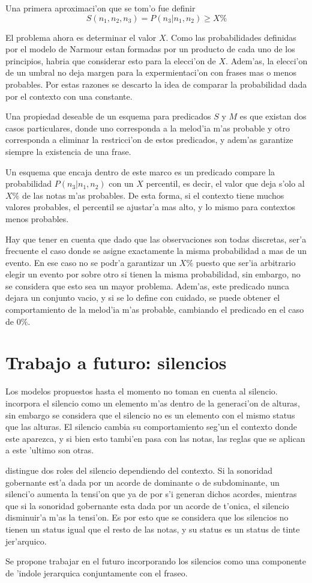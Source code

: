 Una primera aproximaci'on que se tom'o fue definir 
$$S(n_1, n_2, n_3) = P(n_3 | n_1, n_2) \geq X\%$$

El problema ahora es determinar
el valor $X$. Como las probabilidades definidas por el modelo de Narmour estan formadas por un producto de cada uno de los principios, habria 
que considerar esto para la elecci'on de $X$. Adem'as, la elecci'on de un umbral no deja margen para la expermientaci'on con frases
mas o menos probables. 
Por estas razones se descarto la idea de comparar la probabilidad dada por el contexto con una constante. 

Una propiedad deseable de un esquema para predicados $S$ y $M$ es que existan dos casos particulares, 
donde uno corresponda a la melod'ia m'as probable
y otro corresponda a eliminar la restricci'on de estos predicados, y adem'as garantize siempre la existencia de una frase. 

Un esquema que encaja dentro de este marco es un predicado compare la probabilidad $P(n_3 | n_1, n_2)$ con un 
$X$ percentil, es decir, el valor que deja s'olo al $X\%$ de las notas m'as probables.  De esta forma, si el contexto tiene muchos valores probables, 
el percentil se ajustar'a mas alto, y lo mismo para contextos menos probables.

Hay que tener en cuenta que dado que las observaciones son todas discretas, ser'a frecuente el caso donde 
se asigne exactamente la misma probabilidad a mas de un evento. En ese caso no se podr'a garantizar un $X\%$ puesto que ser'ia arbitrario
elegir un evento por sobre otro si tienen la misma probabilidad, sin embargo, no se considera que esto sea un mayor problema. Adem'as, este predicado nunca dejara un conjunto vacio, y si se lo define con cuidado, se puede obtener
el comportamiento de la melod'ia m'as probable, cambiando el predicado en el caso de $0\%$.


\section{Trabajo a futuro: silencios}
Los modelos propuestos hasta el momento no toman en cuenta al silencio. \cite{PaieThesis} incorpora el silencio como un elemento m'as
dentro de la generaci'on de alturas, sin embargo se considera que el silencio no es un elemento con el mismo status que las alturas. 
El silencio cambia su comportamiento seg'un el contexto donde este aparezca, y si bien esto tambi'en pasa con las notas, las reglas que se
aplican a este 'ultimo son otras. 

\cite{Margulis08} distingue dos roles del silencio dependiendo del contexto. Si la sonoridad gobernante est'a dada por un acorde de dominante
o de subdominante, un silenci'o aumenta la tensi'on que ya de por s'i generan dichos acordes, mientras que si la sonoridad gobernante
esta dada por un acorde de t'onica, el silencio disminuir'a m'as la tensi'on. Es por esto que se considera que los silencios no tienen 
un status igual que el resto de las notas, y su status es un status de tinte jer'arquico.

Se propone trabajar en el futuro incorporando los silencios como una componente de 'indole jerarquica conjuntamente con el fraseo.
